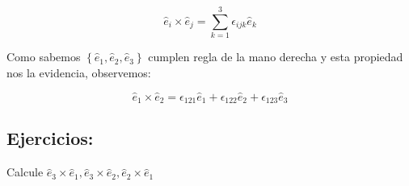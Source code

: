 $$
\hat{e}_{i} \times \hat{e}_{j}=\sum_{k=1}^{3} \epsilon_{i j k} \widehat{e}_{k}
$$

Como sabemos $\left\{\widehat{e}_{1}, \hat{e}_{2}, \widehat{e}_{3}\right\}$ cumplen regla de la mano derecha y esta propiedad nos la evidencia, observemos:

$$
\hat{e}_{1} \times \widehat{e}_{2}=\epsilon_{121} \widehat{e}_{1}+\epsilon_{122} \hat{e}_{2}+\epsilon_{123} \hat{e}_{3}
$$

\subsection{Ejercicios:}
Calcule $\widehat{e}_{3} \times \hat{e}_{1}, \hat{e}_{3} \times \widehat{e}_{2}, \hat{e}_{2} \times \hat{e}_{1}$

